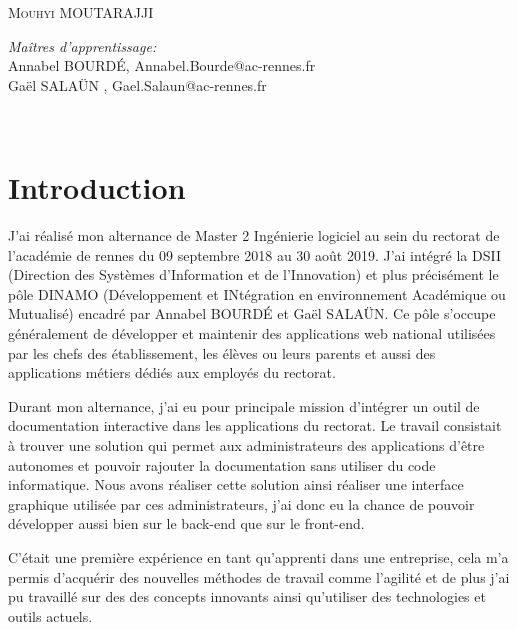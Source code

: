 \documentclass[12pt]{article}
\begin{document}
\begin{titlepage}
	\centering   %
	\textsc{ Mouhyi MOUTARAJJI}\\
		\begin{flushleft} \large
		    \emph{Maîtres d'apprentissage:} \\
		    Annabel BOURDÉ, Annabel.Bourde@ac-rennes.fr\\
			Gaël SALAÜN , Gael.Salaun@ac-rennes.fr\\
			
			
		\end{flushleft}
	
\end{titlepage}


\newpage

\tableofcontents
~
\newpage

\section{Introduction}

J'ai réalisé mon alternance de Master 2 Ingénierie logiciel au sein du rectorat de l'académie de rennes du 09 septembre 2018 au 30 août 2019. J'ai intégré la DSII (Direction des Systèmes d'Information et de l'Innovation) et plus précisément le pôle DINAMO (Développement et INtégration en environnement Académique ou Mutualisé) encadré par Annabel BOURDÉ et Gaël SALAÜN. Ce pôle s'occupe généralement de développer et maintenir des applications web national utilisées par les chefs des établissement, les élèves  ou leurs parents et aussi des applications métiers dédiés aux employés du rectorat.\newline


Durant mon alternance, j'ai eu pour principale mission d'intégrer un outil de documentation interactive dans les applications du rectorat. Le travail consistait à trouver une solution qui permet aux administrateurs des applications d'être autonomes et pouvoir rajouter la documentation sans utiliser du code informatique. Nous avons réaliser cette solution ainsi réaliser une interface graphique utilisée par ces administrateurs, j'ai donc eu la chance de pouvoir développer aussi bien sur le back-end que sur le front-end.\newline   

C'était une première expérience en tant qu'apprenti dans une entreprise, cela m'a permis d'acquérir des nouvelles méthodes de travail comme l'agilité et de plus j'ai pu travaillé sur des des concepts innovants ainsi qu'utiliser des technologies et outils actuels.\newline
\end{document}
